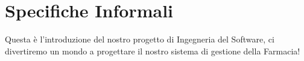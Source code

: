 \chapter{Specifiche Informali}
Questa è l'introduzione del nostro progetto di Ingegneria del Software, ci divertiremo un mondo a progettare il nostro sistema di gestione della Farmacia!